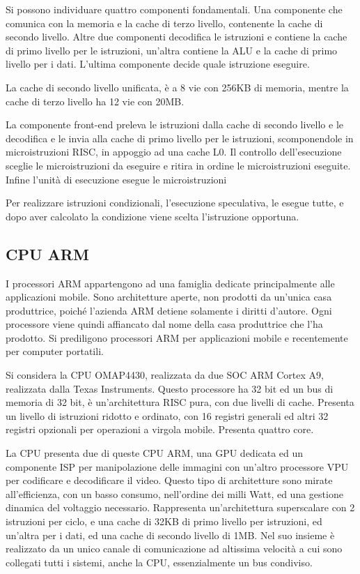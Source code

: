 \documentclass{article}
\numberwithin{equation}{subsection}
\begin{document}
Si possono individuare quattro componenti fondamentali. %
Una componente che comunica con la memoria e la cache di terzo livello, contenente la cache di secondo livello. Altre due componenti decodifica le istruzioni e contiene la 
cache di primo livello per le istruzioni, un'altra contiene la ALU e la cache di primo livello per i dati. L'ultima componente decide quale istruzione eseguire. 

La cache di secondo livello unificata, è a 8 vie con 256KB di memoria, mentre la cache di terzo livello ha 12 vie con 20MB. 

La componente front-end preleva le istruzioni dalla cache di secondo livello e le decodifica e le invia alla cache di primo livello per le istruzioni, scomponendole in 
microistruzioni RISC, in appoggio ad una cache L0. Il controllo dell'esecuzione sceglie le microistruzioni da eseguire e ritira in ordine le microistruzioni eseguite. 
Infine l'unità di esecuzione esegue le microistruzioni %


Per realizzare istruzioni condizionali, l'esecuzione speculativa, le esegue tutte, e dopo aver calcolato la condizione viene scelta l'istruzione opportuna. 

\subsection{CPU ARM}

I processori ARM appartengono ad una famiglia dedicate principalmente alle applicazioni mobile. Sono architetture aperte, non prodotti da un'unica casa produttrice, poiché 
l'azienda ARM detiene solamente i diritti d'autore. Ogni processore viene quindi affiancato dal nome della casa produttrice che l'ha prodotto. Si prediligono processori ARM 
per applicazioni mobile e recentemente per computer portatili. 

Si considera la CPU OMAP4430, realizzata da due SOC ARM Cortex A9, realizzata dalla Texas Instruments. Questo processore ha 32 bit ed un bus di memoria di 32 bit, 
è un'architettura RISC pura, con due livelli di cache. Presenta un livello di istruzioni ridotto e ordinato, con 16 registri generali ed altri 32 
registri opzionali per operazioni a virgola mobile. Presenta quattro core. 

La CPU presenta due di queste CPU ARM, una GPU dedicata ed un componente ISP per manipolazione delle immagini con un'altro processore VPU per codificare e decodificare il video. 
Questo tipo di architetture sono mirate all'efficienza, con un basso consumo, nell'ordine dei milli Watt, ed una gestione dinamica del voltaggio necessario. 
Rappresenta un'architettura superscalare con 2 istruzioni per ciclo, e una cache di 32KB di primo livello per istruzioni, ed un'altra per i dati, ed una cache di secondo livello di 
1MB. 
Nel suo insieme è realizzato da un unico canale di comunicazione ad altissima velocità a cui sono collegati tutti i sistemi, anche la CPU, essenzialmente un bus condiviso. 


\end{document}
